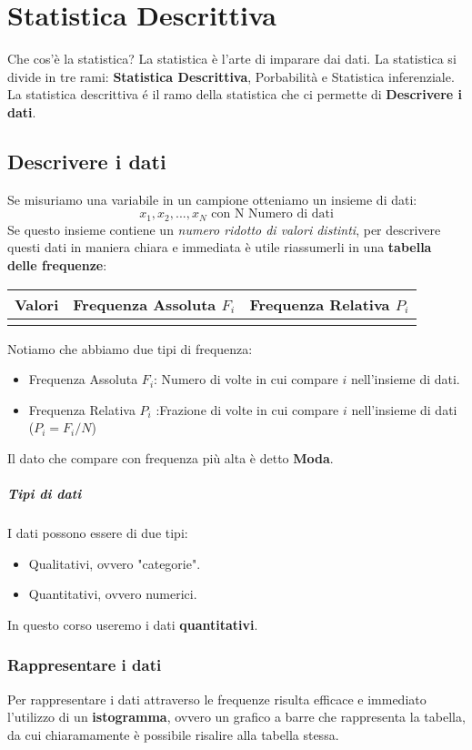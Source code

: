 \chapter{Statistica Descrittiva}
Che cos'è la statistica? La statistica è l'arte di imparare dai dati.
La statistica si divide in tre rami: \textbf{Statistica Descrittiva}, Porbabilità e Statistica inferenziale.
La statistica descrittiva é il ramo della statistica che ci permette di \textbf{Descrivere i dati}.
\section{Descrivere i dati}
Se misuriamo una variabile in un campione otteniamo un insieme di dati:
$$x_1, x_2, ..., x_N \text{ con N Numero di dati}$$
Se questo insieme contiene un \emph{numero ridotto di valori distinti}, per descrivere questi dati
in maniera chiara e immediata è utile riassumerli in una \textbf{tabella delle frequenze}:
\begin{center}
    \begin{tabularx}{.95\textwidth}{ c|X|X }
        Valori & Frequenza Assoluta $F_i$ & Frequenza Relativa $P_i$ \\
        \hline
        &&
    \end{tabularx}
\end{center}
Notiamo che abbiamo due tipi di frequenza:
\begin{itemize}
    \item Frequenza Assoluta $F_i$: Numero di volte in cui compare $i$ nell'insieme di dati.
    \item Frequenza Relativa $P_i$ :Frazione di volte in cui compare $i$ nell'insieme di dati ($P_i = F_i / N$)
\end{itemize}
Il dato che compare con frequenza più alta è detto \textbf{Moda}.
\paragraph{Tipi di dati}I dati possono essere di due tipi:
\begin{itemize}
    \item Qualitativi, ovvero "categorie".
    \item Quantitativi, ovvero numerici.
\end{itemize}
In questo corso useremo i dati \textbf{quantitativi}.

\subsection*{Rappresentare i dati}
Per rappresentare i dati attraverso le frequenze risulta efficace e immediato l'utilizzo di un \textbf{istogramma},
ovvero un grafico a barre che rappresenta la tabella, da cui chiaramamente è possibile risalire alla tabella stessa.

